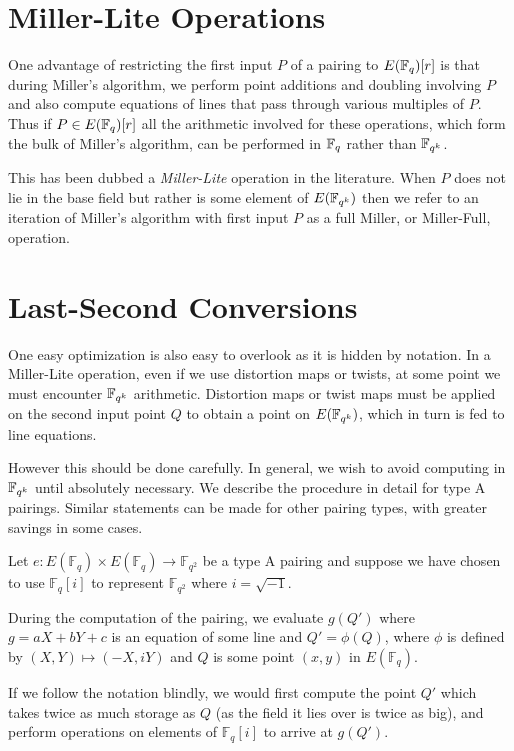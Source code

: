 \section {Miller-Lite Operations}

One advantage of restricting the first input $P$ of a pairing
to $E(\mathbb{F}_q)[r]$ is that during Miller's algorithm, we perform point additions
and doubling involving $P$ and also compute equations of lines that
pass through various multiples of $P$. Thus if $P \in E(\mathbb{F}_q)[r]$ all the
arithmetic involved for these operations, which form the bulk of Miller's
algorithm, can be performed in $\mathbb{F}_q$ rather
than $\mathbb{F}_{q^k}$.

This has been dubbed a \emph{Miller-Lite} operation in the literature.
When $P$ does not lie in the base field but rather is some element of
$E(\mathbb{F}_{q^k})$ then we refer to an iteration of Miller's algorithm with
first input $P$ as a full Miller, or Miller-Full, operation.

\section{Last-Second Conversions}

One easy optimization is also easy to overlook as it is hidden by
notation.
In a Miller-Lite operation, even if we use distortion maps or twists,
at some point we must encounter $\mathbb{F}_{q^k}$ arithmetic.
Distortion maps or twist maps must be applied
on the second input point $Q$ to obtain a point on $E(\mathbb{F}_{q^k})$, which in turn
is fed to line equations.

However this should be done carefully.
In general, we wish to avoid computing in $\mathbb{F}_{q^k}$
until absolutely necessary. We describe the procedure in detail for
type A pairings. Similar statements can be made for other pairing types,
with greater savings in some cases.

Let $e : E(\mathbb{F}_q) \times E(\mathbb{F}_q)
\rightarrow \mathbb{F}_{q^2}$ be a type A pairing 
and suppose we have chosen to
use $\mathbb{F}_q [i]$ to represent $\mathbb{F}_{q^2}$ where $i =\sqrt{-1}$.

During the computation of the pairing,
we evaluate $g(Q')$ where $g = aX + bY + c$ is an equation of some line and
$Q' = \phi(Q)$, where $\phi$ is defined by  $(X,Y) \mapsto (-X, iY)$
and $Q$ is some point $(x,y)$ in $E(\mathbb{F}_q)$.

If we follow the notation blindly, we would first compute the point
$Q'$ which takes twice as much storage as $Q$ (as the field it lies over is
twice as big), and perform operations on elements of $\mathbb{F}_q[i]$ to
arrive at $g(Q')$.

